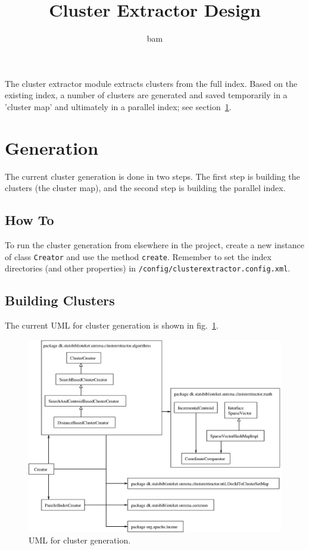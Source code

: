 \documentclass[a4paper,12pt]{article}
\title{Cluster Extractor Design}
\author{bam}
\begin{document}
\maketitle

The cluster extractor module extracts clusters from the full
index. Based on the existing index, a number of clusters are generated
and saved temporarily in a 'cluster map' and ultimately in a parallel
index; see section~\ref{sec_generation}.

\section{Generation}
\label{sec_generation}

The current cluster generation is done in two steps. The first step is
building the clusters (the cluster map), and the second step is
building the parallel index.

\subsection{How To}

To run the cluster generation from elsewhere in the project, create a
new instance of class \texttt{Creator} and use the method
\texttt{create}. Remember to set the index directories (and other
properties) in \texttt{/config/clusterextractor.config.xml}.

\subsection{Building Clusters}

The current UML for cluster generation is shown in
fig.~\ref{fig:generationUML}.

\begin{figure}[!htb]
\includegraphics[width=.9\textwidth]{fig/clusterExtractorUML.eps}
\caption{UML for cluster generation.}
\label{fig:generationUML}
\end{figure}
\end{document}
